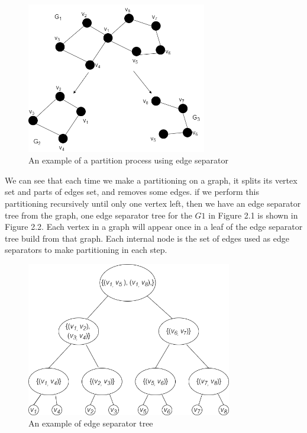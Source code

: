 \documentclass[12pt,glossary]{dalthesis}
\begin{document}
\begin{figure}[h]
\centering
\includegraphics[width=0.7\textwidth]{partition}
\caption{An example of a partition process using edge separator}
\end{figure}

We can see that each time we make a partitioning on a graph, it splits its vertex set and parts of edges set, and removes some edges. if we perform this partitioning recursively until only one vertex left, then we have an edge separator tree from the graph, one edge separator tree for the $G1$ in Figure 2.1 is shown in Figure 2.2. Each vertex in a graph will appear once in a leaf of the edge separator tree build from that graph. Each internal node is the set of edges used as edge separators to make partitioning in each step.

\begin{figure}[h]
\centering
\includegraphics[width=0.8\textwidth]{separatorTree}
\caption{An example of edge separator tree}
\end{figure}
\end{document}
